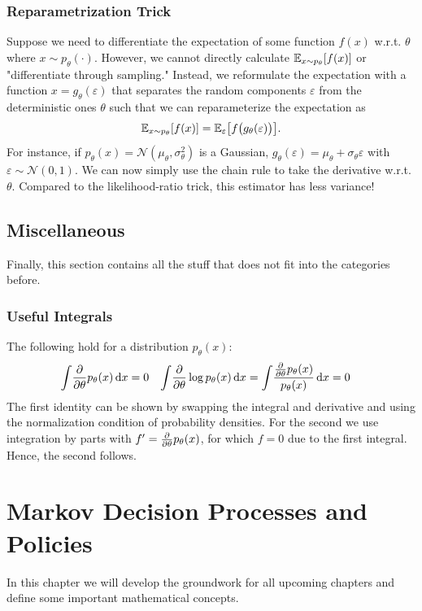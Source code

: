 		\subsection{Reparametrization Trick}
			Suppose we need to differentiate the expectation of some function \( f(x) \) w.r.t. \(\theta\) where \( x \sim p_\theta(\cdot) \). However, we cannot directly calculate \( \mathbb{E}_{x \sim p_\theta}[f(x)] \) or "differentiate through sampling." Instead, we reformulate the expectation with a function \( x = g_\theta(\varepsilon) \) that separates the random components \(\varepsilon\) from the deterministic ones \(\theta\) such that we can reparameterize the expectation as
			\begin{equation}
				\mathbb{E}_{x \sim p_\theta}[f(x)] = \mathbb{E}_\varepsilon\bigl[ f\bigl( g_\theta(\varepsilon) \bigr) \bigr].
			\end{equation}
			For instance, if \( p_\theta(x) = \mathcal{N}(\mu_\theta, \sigma_\theta^2) \) is a Gaussian, \( g_\theta(\varepsilon) = \mu_\theta + \sigma_\theta \varepsilon \) with \( \varepsilon \sim \mathcal{N}(0, 1) \). We can now simply use the chain rule to take the derivative w.r.t. \(\theta\). Compared to the likelihood-ratio trick, this estimator has less variance!

	\section{Miscellaneous}
		Finally, this section contains all the stuff that does not fit into the categories before.

		\subsection{Useful Integrals}
			The following hold for a distribution \( p_\theta(x) \):
			\begin{align}
				\int\! \pdv{\theta} p_\theta(x) \dd{x} &= 0 &
				\int\! \pdv{\theta} \log p_\theta(x) \dd{x} &= \int\! \frac{\pdv{\theta} p_\theta(x)}{p_\theta(x)} \dd{x} = 0
				\label{eq:usefulIntegrals}
			\end{align}
			The first identity can be shown by swapping the integral and derivative and using the normalization condition of probability densities. For the second we use integration by parts with \( f' = \pdv{\theta} p_\theta(x) \), for which \(f = 0\) due to the first integral. Hence, the second follows.

\chapter{Markov Decision Processes and Policies}
	In this chapter we will develop the groundwork for all upcoming chapters and define some important mathematical concepts.

